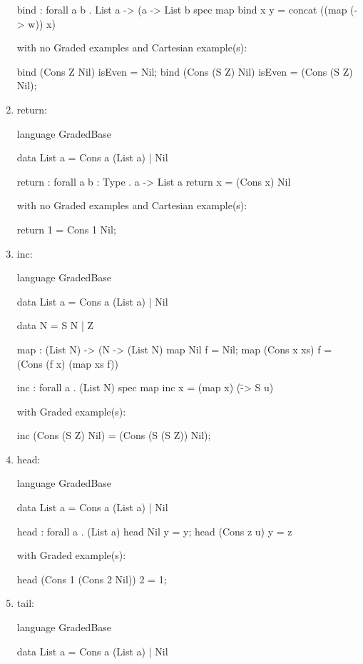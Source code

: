 \begin{enumerate}
\begin{granule}
bind : forall a b 
     . List a %
     -> (a %
     -> List b
spec 
    map %
bind x y = concat ((map (\w -> w)) x)
\end{granule}
with no Graded examples and Cartesian example(s):
\begin{granule}
bind (Cons Z Nil) isEven = Nil;
bind (Cons (S Z) Nil) isEven = (Cons (S Z) Nil);
\end{granule}
\item return: 
\begin{granule}
language GradedBase

data List a =  Cons a (List a) | Nil 

return : forall { a b : Type} . a -> List a
return x = (Cons x) Nil
\end{granule}
with no Graded examples and Cartesian example(s):
\begin{granule}
return 1 = Cons 1 Nil;
\end{granule}
\item inc: 
\begin{granule}
language GradedBase

data List a = Cons a (List a) | Nil
    
data N = S N | Z
    
map : (List N) %
    -> (N %
    -> (List N)
map Nil f = Nil; 
map (Cons x xs) f = (Cons (f x) (map xs f))
    
inc : forall a . (List N) %
spec
    map %
inc x = (map x) (\u -> S u)
\end{granule}
with Graded example(s):
\begin{granule}
inc (Cons (S Z) Nil) = (Cons (S (S Z)) Nil);
\end{granule}
\item head:
\begin{granule}
language GradedBase

data List a = Cons a (List a) | Nil 
    
head : forall a . (List a) %
head Nil y = y;
head (Cons z u) y = z
\end{granule}
with Graded example(s):
\begin{granule}
head (Cons 1 (Cons 2 Nil)) 2 = 1;
\end{granule}
\item tail:
\begin{granule}
language GradedBase

data List a = Cons a (List a) | Nil 


\end{granule}
\end{enumerate}
